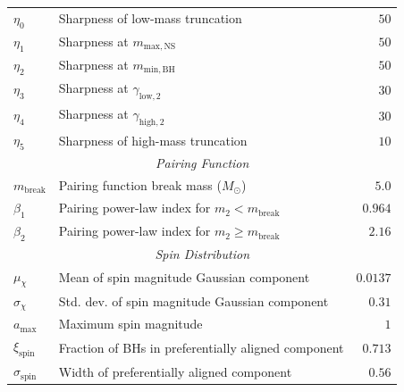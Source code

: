 \begin{table}[htb]
\begin{tabular}{llr}
\midrule
$\eta_0$ & Sharpness of low-mass truncation & $50$ \\
$\eta_1$ & Sharpness at $m_{\mathrm{max,NS}}$ & $50$ \\
$\eta_2$ & Sharpness at $m_{\mathrm{min,BH}}$ & $50$ \\
$\eta_3$ & Sharpness at $\gamma_{\mathrm{low},2}$ & $30$ \\
$\eta_4$ & Sharpness at $\gamma_{\mathrm{high},2}$ & $30$ \\
$\eta_5$ & Sharpness of high-mass truncation & $10$ \\

\midrule
\multicolumn{3}{c}{\textit{Pairing Function}} \\
\midrule
$m_{\mathrm{break}}$ & Pairing function break mass ($M_\odot$) & $5.0$ \\
$\beta_1$ & Pairing power-law index for $m_2 < m_{\mathrm{break}}$ & $0.964$ \\
$\beta_2$ & Pairing power-law index for $m_2 \geq m_{\mathrm{break}}$ & $2.16$ \\

\midrule
\multicolumn{3}{c}{\textit{Spin Distribution}} \\
\midrule
$\mu_{\chi}$ & Mean of spin magnitude Gaussian component & $0.0137$ \\
$\sigma_{\chi}$ & Std. dev. of spin magnitude Gaussian component & $0.31$ \\
$a_{\mathrm{max}}$ & Maximum spin magnitude & $1$ \\
\midrule
$\xi_{\mathrm{spin}}$ & Fraction of BHs in preferentially aligned component & $0.713$ \\
$\sigma_{\mathrm{spin}}$ & Width of preferentially aligned component & $0.56$ \\
\bottomrule
\end{tabular}
\end{table}
